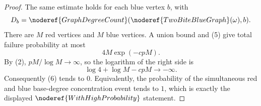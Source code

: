 \begin{proof}
The same estimate holds for each blue vertex \(b\), with
\[
D_b=\noderef{GraphDegreeCount}(\noderef{TwoBiteBlueGraph}(\omega),b).
\]
There are \(M\) red vertices and \(M\) blue vertices.  A union bound and
(5) give total failure probability at most
\[
4M\exp(-c pM).
\tag{6}
\]
By (2), \(pM/\log M\to\infty\), so the logarithm of the right side is
\[
\log 4+\log M-cpM\longrightarrow -\infty.
\]
Consequently (6) tends to \(0\).  Equivalently, the probability of the
simultaneous red and blue base-degree concentration event tends to \(1\),
which is exactly the displayed \(\noderef{WithHighProbability}\) statement.
\end{proof}
